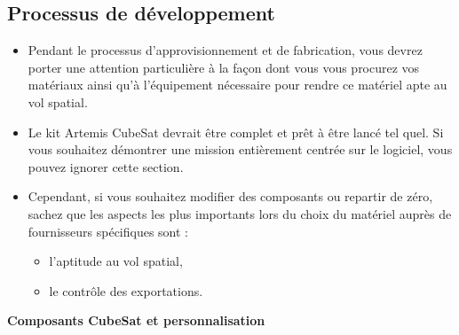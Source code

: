 \subsection{Processus de développement}
\begin{itemize}
    \item Pendant le processus d’approvisionnement et de fabrication, vous devrez porter une attention particulière à la façon dont vous vous procurez vos matériaux ainsi qu’à l’équipement nécessaire pour rendre ce matériel apte au vol spatial.  
    \item Le kit Artemis CubeSat devrait être complet et prêt à être lancé tel quel. Si vous souhaitez démontrer une mission entièrement centrée sur le logiciel, vous pouvez ignorer cette section.  
    \item Cependant, si vous souhaitez modifier des composants ou repartir de zéro, sachez que les aspects les plus importants lors du choix du matériel auprès de fournisseurs spécifiques sont :  
    \begin{itemize}
        \item l’aptitude au vol spatial,  
        \item le contrôle des exportations.  
    \end{itemize}
\end{itemize}
\textbf{Composants CubeSat et personnalisation}
